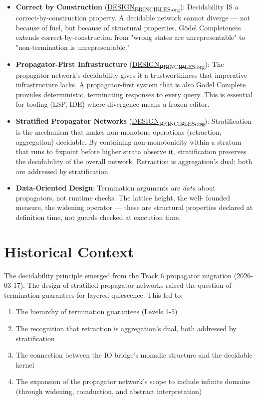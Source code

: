 \documentclass[11pt]{article}
\begin{document}
\begin{itemize}
\item \textbf{Correct by Construction} (\href{DESIGN\_PRINCIPLES.org}{DESIGN\textsubscript{PRINCIPLES.org}}): Decidability IS
a correct-by-construction property. A decidable network cannot
diverge --- not because of fuel, but because of structural properties.
Gödel Completeness extends correct-by-construction from "wrong
states are unrepresentable" to "non-termination is unrepresentable."

\item \textbf{Propagator-First Infrastructure} (\href{DESIGN\_PRINCIPLES.org}{DESIGN\textsubscript{PRINCIPLES.org}}): The
propagator network's decidability gives it a trustworthiness that
imperative infrastructure lacks. A propagator-first system that is
also Gödel Complete provides deterministic, terminating responses
to every query. This is essential for tooling (LSP, IDE) where
divergence means a frozen editor.

\item \textbf{Stratified Propagator Networks} (\href{DESIGN\_PRINCIPLES.org}{DESIGN\textsubscript{PRINCIPLES.org}}): Stratification
is the mechanism that makes non-monotone operations (retraction,
aggregation) decidable. By containing non-monotonicity within a
stratum that runs to fixpoint before higher strata observe it,
stratification preserves the decidability of the overall network.
Retraction is aggregation's dual; both are addressed by stratification.

\item \textbf{Data-Oriented Design}: Termination arguments are \emph{data} about
propagators, not runtime checks. The lattice height, the well-
founded measure, the widening operator --- these are structural
properties declared at definition time, not guards checked at
execution time.
\end{itemize}
\section{Historical Context}
\label{sec:orgb51ba23}

The decidability principle emerged from the Track 6 propagator
migration (2026-03-17). The design of stratified propagator networks
raised the question of termination guarantees for layered quiescence.
This led to:

\begin{enumerate}
\item The hierarchy of termination guarantees (Levels 1-5)
\item The recognition that retraction is aggregation's dual, both
addressed by stratification
\item The connection between the IO bridge's monadic structure and the
decidable kernel
\item The expansion of the propagator network's scope to include infinite
domains (through widening, coinduction, and abstract interpretation)
\end{enumerate}
\end{document}
